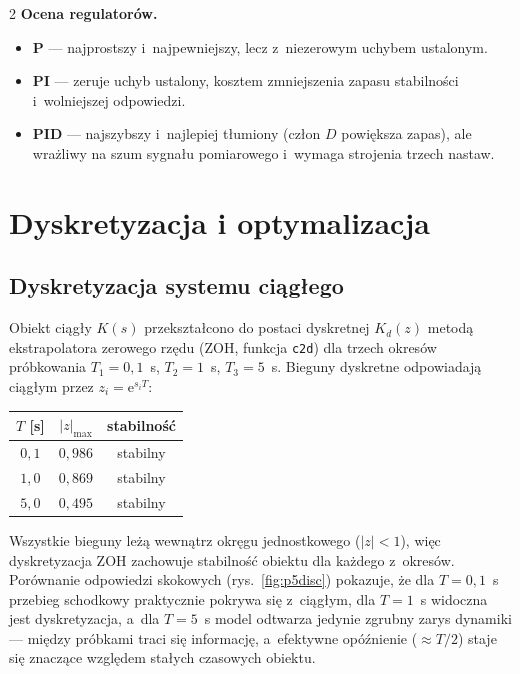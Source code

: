 \documentclass[12pt,a4paper]{article}
\begin{document}
\begin{multicols*}{2}
\textbf{Ocena regulatorów.}
\begin{itemize}[leftmargin=*, nosep]
\item \textbf{P} — najprostszy i~najpewniejszy, lecz z~niezerowym uchybem
ustalonym.
\item \textbf{PI} — zeruje uchyb ustalony, kosztem zmniejszenia zapasu
stabilności i~wolniejszej odpowiedzi.
\item \textbf{PID} — najszybszy i~najlepiej tłumiony (człon $D$ powiększa zapas),
ale wrażliwy na szum sygnału pomiarowego i~wymaga strojenia trzech nastaw.
\end{itemize}

\section{Dyskretyzacja i optymalizacja}
\subsection{Dyskretyzacja systemu ciągłego}
Obiekt ciągły $K(s)$ przekształcono do postaci dyskretnej $K_d(z)$ metodą
ekstrapolatora zerowego rzędu (ZOH, funkcja \texttt{c2d}) dla trzech okresów
próbkowania $T_1=0{,}1$~s, $T_2=1$~s, $T_3=5$~s. Bieguny dyskretne odpowiadają
ciągłym przez $z_i=\mathrm{e}^{s_i T}$:

\begin{center}\small
{}
\begin{tabular}{ccc}
\toprule
$T$ [s] & $|z|_{\max}$ & stabilność \\
\midrule
$0{,}1$ & $0{,}986$ & stabilny \\
$1{,}0$ & $0{,}869$ & stabilny \\
$5{,}0$ & $0{,}495$ & stabilny \\
\bottomrule
\end{tabular}
\end{center}

Wszystkie bieguny leżą wewnątrz okręgu jednostkowego ($|z|<1$), więc
dyskretyzacja ZOH zachowuje stabilność obiektu dla każdego z~okresów.
Porównanie odpowiedzi skokowych (rys.~\ref{fig:p5disc}) pokazuje, że dla
$T=0{,}1$~s przebieg schodkowy praktycznie pokrywa się z~ciągłym, dla $T=1$~s
widoczna jest dyskretyzacja, a~dla $T=5$~s model odtwarza jedynie zgrubny
zarys dynamiki — między próbkami traci się informację, a~efektywne opóźnienie
($\approx T/2$) staje się znaczące względem stałych czasowych obiektu.


\end{multicols*}
\end{document}
